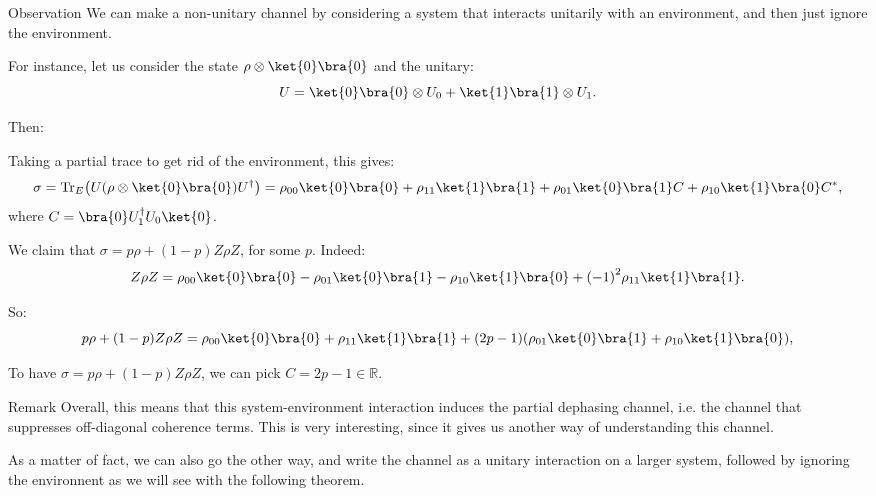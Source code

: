 \documentclass[a4paper]{article}
\begin{document}
\begin{parag}{Observation}
    We can make a non-unitary channel by considering a system that interacts unitarily with an environment, and then just ignore the environment.

    For instance, let us consider the state $\rho \otimes \ket{0}\bra{0}$ and the unitary: 
    \[U = \ket{0}\bra{0} \otimes U_0 + \ket{1}\bra{1} \otimes U_1.\]

    Then: 

    Taking a partial trace to get rid of the environment, this gives: 
    \[\sigma = \Tr_E\left(U \left(\rho \otimes \ket{0}\bra{0}\right)U^{\dagger}\right) = \rho_{00} \ket{0}\bra{0} + \rho_{11} \ket{1}\bra{1} + \rho_{01} \ket{0}\bra{1} C + \rho_{10} \ket{1}\bra{0} C^*,\]
    where $C = \bra{0} U_1^{\dagger} U_0 \ket{0}$.
    
    We claim that $\sigma = p \rho + \left(1-p\right) Z \rho Z$, for some $p$. Indeed: 
    \[Z \rho Z = \rho_{00} \ket{0}\bra{0} - \rho_{01} \ket{0}\bra{1} - \rho_{10} \ket{1}\bra{0} + \left(-1\right)^2 \rho_{11} \ket{1}\bra{1}.\]

    So: 
    \[p \rho + \left(1 - p\right) Z \rho Z = \rho_{00} \ket{0}\bra{0} + \rho_{11} \ket{1}\bra{1} + \left(2p - 1\right)\left(\rho_{01} \ket{0}\bra{1} + \rho_{10}\ket{1}\bra{0}\right),\]
    
    To have $\sigma = p \rho + \left(1 -p \right) Z \rho Z$, we can pick $C = 2p-1 \in \mathbb{R}$.

    \begin{subparag}{Remark}
        Overall, this means that this system-environment interaction induces the partial dephasing channel, i.e. the channel that suppresses off-diagonal coherence terms. This is very interesting, since it gives us another way of understanding this channel.

        As a matter of fact, we can also go the other way, and write the channel as a unitary interaction on a larger system, followed by ignoring the environnent as we will see with the following theorem.
        
    \end{subparag}
\end{parag}
\end{document}
